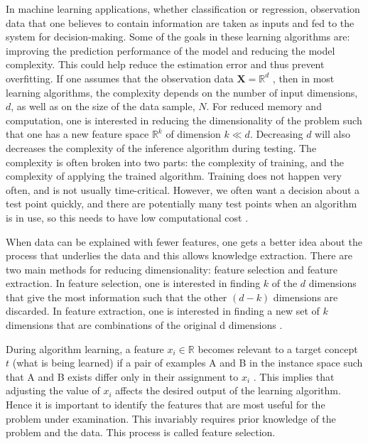 In machine learning applications, whether classification or regression, observation
data that one believes to contain information are taken as inputs and fed
to the system for decision-making. Some of the goals in these learning algorithms are: improving the prediction performance of the model and reducing the model complexity. This could help reduce the estimation error and thus prevent overfitting. If one assumes that the observation data $\textbf{X}=\mathbb{R}^d$ \citep{shalev2014understanding}, then in most learning algorithms, the complexity depends on the number of
input dimensions, $d$, as well as on the size of the data sample, $N$. 
For reduced memory and computation, one is interested in reducing
the dimensionality of the problem such that one has a new feature space $\mathbb{R}^k$ of dimension $k \ll d $. Decreasing $d$ will also decreases the
complexity of the inference algorithm during testing. The
complexity is often broken into two parts: the complexity of training, and the complexity of applying the trained algorithm. Training does not happen very often, and is not usually time-critical. However, we often want a decision about a test point quickly, and there are potentially many test points when an algorithm is in use, so this needs to have low computational cost \citep{marsland2015machine}.

When data can be explained with fewer features, one gets a better idea about the process that underlies the data and this allows knowledge extraction. There are two main methods for reducing dimensionality: feature selection and feature extraction. In feature selection, one is interested in
finding $k$ of the $d$ dimensions that give the most information such that the other $(d - k)$ dimensions are discarded. In feature extraction, one is interested in finding a new set of $k$ dimensions that are combinations of the original d dimensions \citep{alpaydin2014introduction}.
 
During algorithm learning, a feature $x_i\in\mathbb{R}$ becomes relevant to a target concept $t$ (what is being learned) if  a pair of examples A and B in the instance space such that A and B exists differ only in their assignment to  $x_i$ \citep{blum1997selection}. This implies that adjusting the value of $x_i$ affects the desired output of the learning algorithm. Hence it is important to identify the features that are most useful for the problem under examination. This invariably requires prior knowledge of the problem and the data. This process is called feature selection.

